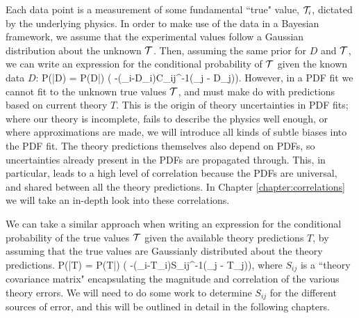 Each data point is a measurement of some fundamental ``true" value, $\mathcal{T}_i$, dictated by the underlying physics. In order to make use of the data in a Bayesian framework, we assume that the experimental values follow a Gaussian distribution about the unknown $\mathcal{T}$. Then, assuming the same prior for $D$ and $\mathcal{T}$, we can write an expression for the conditional probability of $\mathcal{T}$ given the known data $D$:
\beq
\label{eqn:gaussexp}
P(\truev|D) = P(D|\truev) \propto \exp\bigg( -(\truev_i-D_i)C_{ij}^{-1}(\truev_j - D_j)\bigg).
\eeq
However, in a PDF fit we cannot fit to the unknown true values $\mathcal{T}$, and must make do with predictions based on current theory $T$. This is the origin of theory uncertainties in PDF fits; where our theory is incomplete, fails to describe the physics well enough, or where approximations are made, we will introduce all kinds of subtle biases into the PDF fit. The theory predictions themselves also depend on PDFs, so uncertainties already present in the PDFs are propagated through. This, in particular, leads to a high level of correlation because the PDFs are universal, and shared between all the theory predictions. In Chapter \ref{chapter:correlations} we will take an in-depth look into these correlations.

We can take a similar approach when writing an expression for the conditional probability of the true values $\mathcal{T}$ given the available theory predictions $T$, by assuming that the true values are Gaussianly distributed about the theory predictions.
\beq
\label{eqn:gausstheory}
P(\truev|T) = P(T|\truev) \propto \exp\bigg( -(\truev_i-T_i)S_{ij}^{-1}(\truev_j - T_j)\bigg),
\eeq
where $S_{ij}$ is a ``theory covariance matrix" encapsulating the magnitude and correlation of the various theory errors. We will need to do some work to determine $S_{ij}$ for the different sources of error, and this will be outlined in detail in the following chapters. 

